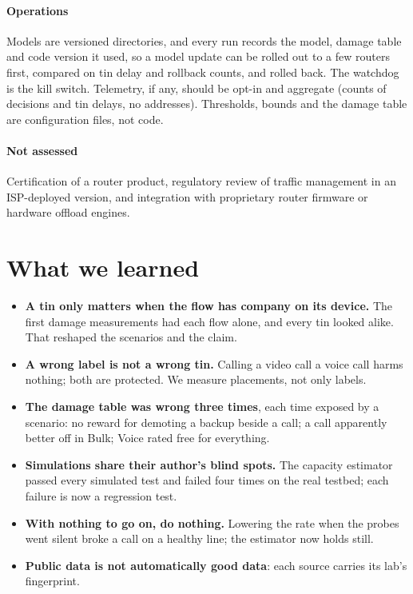\documentclass[11pt,a4paper]{article}
\begin{document}
\paragraph{Operations} Models are versioned directories, and every run records the model, damage table and code version it used, so a model update can be rolled out to a few routers first, compared on tin delay and rollback counts, and rolled back. The watchdog is the kill switch. Telemetry, if any, should be opt-in and aggregate (counts of decisions and tin delays, no addresses). Thresholds, bounds and the damage table are configuration files, not code.

\paragraph{Not assessed} Certification of a router product, regulatory review of traffic management in an ISP-deployed version, and integration with proprietary router firmware or hardware offload engines.

\section{What we learned}
\begin{itemize}
\item \textbf{A tin only matters when the flow has company on its device.} The first damage measurements had each flow alone, and every tin looked alike. That reshaped the scenarios and the claim.
\item \textbf{A wrong label is not a wrong tin.} Calling a video call a voice call harms nothing; both are protected. We measure placements, not only labels.
\item \textbf{The damage table was wrong three times}, each time exposed by a scenario: no reward for demoting a backup beside a call; a call apparently better off in Bulk; Voice rated free for everything.
\item \textbf{Simulations share their author's blind spots.} The capacity estimator passed every simulated test and failed four times on the real testbed; each failure is now a regression test.
\item \textbf{With nothing to go on, do nothing.} Lowering the rate when the probes went silent broke a call on a healthy line; the estimator now holds still.
\item \textbf{Public data is not automatically good data}: each source carries its lab's fingerprint.
\end{itemize}
\end{document}
